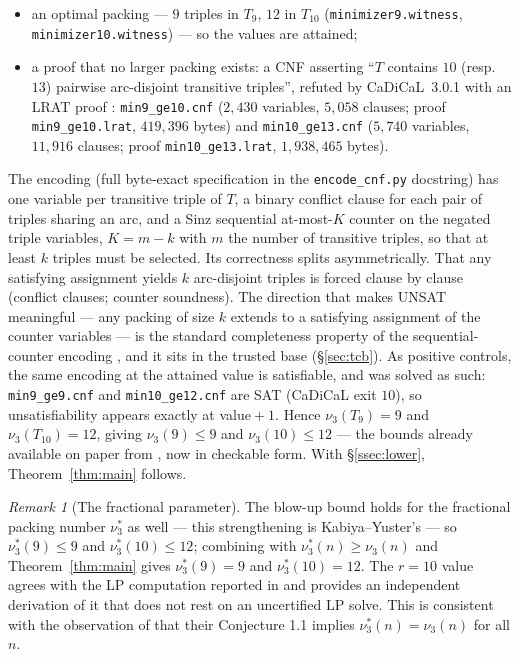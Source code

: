 \documentclass[11pt]{amsart}
\newcommand{\nut}{\nu_3}
\newcommand{\nuf}{\nu_3^{*}}
\theoremstyle{plain}
\theoremstyle{definition}
\theoremstyle{remark}
\newtheorem{remark}[theorem]{Remark}
\begin{document}
\begin{itemize}
\item an optimal packing --- $9$ triples in $T_9$, $12$ in $T_{10}$
(\texttt{minimizer9.witness}, \texttt{minimizer10.witness}) --- so the
values are attained;
\item a proof that no larger packing exists: a CNF asserting ``$T$
contains $10$ (resp.\ $13$) pairwise arc-disjoint transitive triples'',
refuted by CaDiCaL~3.0.1 \cite{CaDiCaL} with an LRAT proof
\cite{LRAT}: \texttt{min9\_ge10.cnf} ($2{,}430$ variables, $5{,}058$
clauses; proof \texttt{min9\_ge10.lrat}, $419{,}396$ bytes) and
\texttt{min10\_ge13.cnf} ($5{,}740$ variables, $11{,}916$ clauses; proof
\texttt{min10\_ge13.lrat}, $1{,}938{,}465$ bytes).
\end{itemize}

\noindent The encoding (full byte-exact specification in the
\texttt{encode\_cnf.py} docstring) has one variable per transitive triple
of $T$, a binary conflict clause for each pair of triples sharing an arc,
and a Sinz sequential at-most-$K$ counter \cite{Sinz05} on the negated
triple variables, $K=m-k$ with $m$ the number of transitive triples, so
that at least $k$ triples must be selected. Its correctness splits
asymmetrically. That any satisfying assignment yields $k$ arc-disjoint
triples is forced clause by clause (conflict clauses; counter soundness).
The direction that makes UNSAT meaningful --- any packing of size $k$
extends to a satisfying assignment of the counter variables --- is the
standard completeness property of the sequential-counter encoding
\cite{Sinz05}, and it sits in the trusted base
(\S\ref{sec:tcb}). As positive controls, the same encoding at the
attained value is satisfiable, and was solved as such:
\texttt{min9\_ge9.cnf} and \texttt{min10\_ge12.cnf} are SAT (CaDiCaL exit
$10$), so unsatisfiability appears exactly at value${}+1$. Hence
$\nut(T_9)=9$ and $\nut(T_{10})=12$, giving $\nut(9)\le9$ and
$\nut(10)\le12$ --- the bounds already available on paper from
\cite[\S4]{Yuster04}, now in checkable form. With \S\ref{ssec:lower},
Theorem~\ref{thm:main} follows.

\begin{remark}[The fractional parameter]\label{rem:frac}
The blow-up bound holds for the fractional packing number $\nuf$ as
well --- this strengthening is Kabiya--Yuster's \cite[\S2.4]{KY08} ---
so
$\nuf(9)\le9$ and $\nuf(10)\le12$; combining with
$\nuf(n)\ge\nut(n)$ and Theorem~\ref{thm:main} gives
$\nuf(9)=9$ and $\nuf(10)=12$. The $r=10$ value agrees with the LP
computation reported in \cite[\S3]{KY08} and provides an independent
derivation of it that does not rest on an uncertified LP solve. This is
consistent with the observation of \cite[\S2.4]{KY08} that their
Conjecture 1.1 implies $\nuf(n)=\nut(n)$ for all $n$.
\end{remark}
\end{document}
